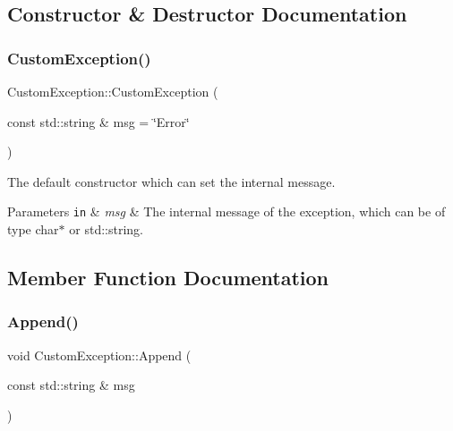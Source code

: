 \subsection{Constructor \& Destructor Documentation}
\mbox{\label{classCustomException_a07dbd163547759b7390b6f4588fff5a8}} 
\subsubsection{\texorpdfstring{Custom\+Exception()}{CustomException()}}
{\footnotesize\ttfamily Custom\+Exception\+::\+Custom\+Exception (\begin{DoxyParamCaption}\item[{const std\+::string \&}]{msg = {\ttfamily \char`\"{}Error\char`\"{}} }\end{DoxyParamCaption})\hspace{0.3cm}{\ttfamily [inline]}}



The default constructor which can set the internal message. 


\begin{DoxyParams}[1]{Parameters}
\mbox{\tt in}  & {\em msg} & The internal message of the exception, which can be of type {\ttfamily char$\ast$} or {\ttfamily std\+::string}. \\
\hline
\end{DoxyParams}


\subsection{Member Function Documentation}
\mbox{\label{classCustomException_ab8885c65813f31562bccdcce422b798c}} 
\subsubsection{\texorpdfstring{Append()}{Append()}}
{\footnotesize\ttfamily void Custom\+Exception\+::\+Append (\begin{DoxyParamCaption}\item[{const std\+::string \&}]{msg }\end{DoxyParamCaption})\hspace{0.3cm}{\ttfamily [inline]}}



